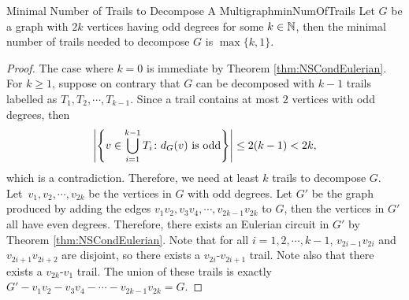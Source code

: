 \documentclass[math]{amznotes}
\theoremstyle{remark}
\newcommand{\0}{\mathbf{0}}
\newcommand{\1}{\mathbf{1}}
\begin{document}
\begin{probox}{Minimal Number of Trails to Decompose A Multigraph}{minNumOfTrails}
    Let $G$ be a graph with $2k$ vertices having odd degrees for some $k \in \mathbb{N}$, then the minimal number of trails needed to decompose $G$ is $\max\{k, 1\}$.
    \tcblower
    \begin{proof}
        The case where $k = 0$ is immediate by Theorem \ref{thm:NSCondEulerian}. For $k \geq 1$, suppose on contrary that $G$ can be decomposed with $k - 1$ trails labelled as $T_1, T_2, \cdots, T_{k - 1}$. Since a trail contains at most $2$ vertices with odd degrees, then
        \begin{equation*}
            {\left\lvert {\left\{v \in \bigcup_{i = 1}^{k - 1}T_i \colon d_G(v) \textrm{ is odd}\right\}} \right\rvert} \leq 2(k - 1) < 2k,
        \end{equation*}
        which is a contradiction. Therefore, we need at least $k$ trails to decompose $G$. Let~$v_1, v_2, \cdots, v_{2k}$ be the vertices in $G$ with odd degrees. Let $G'$ be the graph produced by adding the edges $v_1v_2, v_3v_4, \cdots, v_{2k - 1}v_{2k}$ to $G$, then the vertices in $G'$ all have even degrees. Therefore, there exists an Eulerian circuit in $G'$ by Theorem \ref{thm:NSCondEulerian}. Note that for all $i = 1, 2, \cdots, k - 1$, $v_{2i - 1}v_{2i}$ and $v_{2i + 1}v_{2i + 2}$ are disjoint, so there exists a $v_{2i}$-$v_{2i + 1}$ trail. Note also that there exists a $v_{2k}$-$v_1$ trail. The union of these trails is exactly~$G' - v_1v_2 - v_3v_4 - \cdots - v_{2k - 1}v_{2k} = G$.
    \end{proof}
\end{probox}
\end{document}
